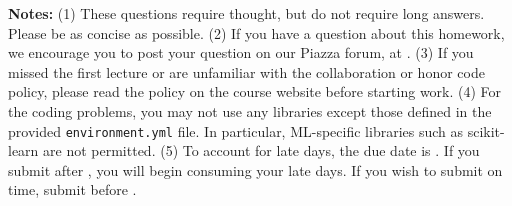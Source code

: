 {\bf Notes:} (1) These questions require thought, but do not require long
answers. Please be as concise as possible.  (2) If you have a question
about this homework, we encourage you to post your question on our
Piazza forum, at \piazza. (3) If you
missed the first lecture or are unfamiliar with the collaboration or honor
code policy, please read the policy on the course website before starting work.
(4) For the coding problems, you may not
use any libraries except those defined in the provided \texttt{environment.yml}
file. In particular, ML-specific libraries such as scikit-learn are not
permitted. (5) To account for late days, the due date is \due. If you submit after
\due, you will begin consuming your
late days. If you wish to submit on time, submit before \due.

